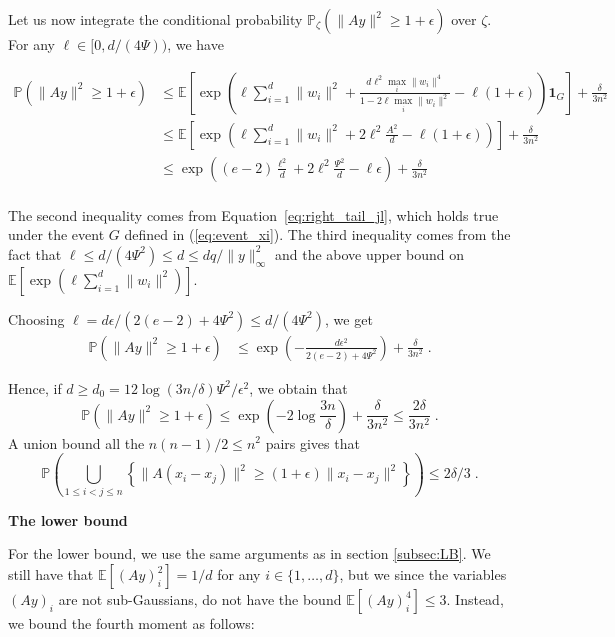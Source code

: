 \documentclass{ps}
\renewcommand{\P}{\mathbb{P}}
\newcommand{\E}{\mathbb{E}}
\newcommand{\1}{\mathbbm{1}}
\theoremstyle{plain}
\begin{document}
Let us now integrate the conditional probability $\P_{\zeta}(\|Ay\|^2 \geq 1+ \epsilon)$ over $\zeta$. For any $\ell \in [0, d/(4\Psi))$, we have

\begin{align*}
	\P(\|Ay\|^2 \geq 1+ \epsilon) &\leq \E\left[\exp\left(\ell \sum_{i=1}^d \|w_i\|^2 + \frac{d\ell^2\max_i\|w_i\|^4}{1-2\ell \max_i\|w_i\|^2}-\ell(1+\epsilon)\right)\mathbf 1_{G}\right] + \frac{\delta}{3n^2}\\
	&\leq \E\left[\exp\left(\ell \sum_{i=1}^d \|w_i\|^2 + 2\ell^2\tfrac{A^2}{d}-\ell(1+\epsilon)\right)\right] + \frac{\delta}{3n^2}\\
	&\leq \exp\left((e-2)\tfrac{\ell^2}{d} + 2\ell^2\tfrac{\Psi^2}{d} - \ell \epsilon\right)+\frac{\delta}{3n^2} \\
\end{align*}

The second inequality comes from Equation~\ref{eq:right_tail_jl}, which holds true under the event $G$ defined in (\ref{eq:event_xi}). The third inequality comes from the fact that $\ell \leq d/(4\Psi^2)\leq d \leq dq/\|y\|^2_{\infty}$ and the above upper bound on $\E[\exp(\ell\sum_{i=1}^d\|w_i\|^2)]$.

Choosing $\ell = d\epsilon/(2(e-2) + 4\Psi^2) \leq d/(4\Psi^2)$, we get
\begin{align*}
	\P(\|Ay\|^2 \geq 1+ \epsilon) &\leq \exp\left(-\frac{d\epsilon^2}{2(e-2) + 4\Psi^2}\right)+\frac{\delta}{3n^2} \; .
\end{align*}

Hence, if $d \geq d_0 = 12\log(3n/\delta)\Psi^2/ \epsilon^2$, we obtain that 
\begin{equation*}
	\P(\|Ay\|^2 \geq 1+ \epsilon) \leq \exp\left(-2\log\frac{3n}{\delta}\right) + \frac{\delta}{3n^2} \leq  \frac{2\delta}{3n^2}\; .
\end{equation*}
A union bound all the $n(n-1)/2 \leq n^2$ pairs gives that 
\begin{equation}\label{eq:ub_sparse}
	\P\left( \bigcup_{1\leq i<j\leq n} \left\{ \big\|A(x_i-x_j)\big\|^2 \geq (1+ \epsilon)\|x_i-x_j\|^2 \right\}  \right) \leq 2\delta/3\;.
\end{equation}

\medskip
\noindent
{\bf The lower bound}

\medskip

For the lower bound, we use the same arguments as in section \ref{subsec:LB}. We still have that $\E [(Ay)_i^2] = 1/d$ for any $i \in \{1, \dots, d\}$, but we since the variables $(Ay)_i$ are not sub-Gaussians, do not have the bound $\E[(Ay)_i^4] \leq 3$. Instead, we bound the fourth moment as follows:
\end{document}
